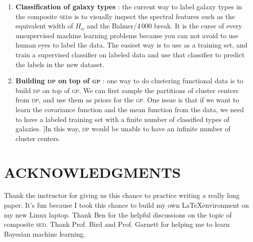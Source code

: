 \documentclass{ar-1col}
\begin{document}
\begin{issues}
\begin{enumerate}
    \item {\bf Classification of galaxy types }: the current way to label galaxy types in the composite \textsc{sed}s is to visually inspect the spectral features such as the equivalent width of $H_\alpha$ and the Balmer/4\,000 break. It is the curse of every unsupervised machine learning problems because you can not avoid to use human eyes to label the data. 
    The easiest way is to use \citet{Forrest2018} as a training set, and train a supervised classifier on labeled data and use that classifier to predict the labels in the new dataset. 
    \item {\bf Building \textsc{dp} on top of \textsc{gp} }: one way to do clustering functional data is to build \textsc{dp} on top of \textsc{gp}. 
    We can first sample the partitions of cluster centers from \textsc{dp}, and use them as priors for the \textsc{gp}. 
    One issue is that if we want to learn the covariance function and the mean function from the data, we need to have a labeled training set with a finite number of classified types of galaxies. 
    ]In this way, \textsc{dp} would be unable to have an infinite number of cluster centers.
\end{enumerate}
\end{issues}

 
\section*{ACKNOWLEDGMENTS}

Thank the instructor for giving us this chance to practice writing a really long paper. 
It's fun because I took this chance to build my own \LaTeX environment on my new Linux laptop.
Thank Ben for the helpful discussions on the topic of composite \textsc{sed}.
Thank Prof. Bird and Prof. Garnett for helping me to learn Bayesian machine learning.



\end{document}
